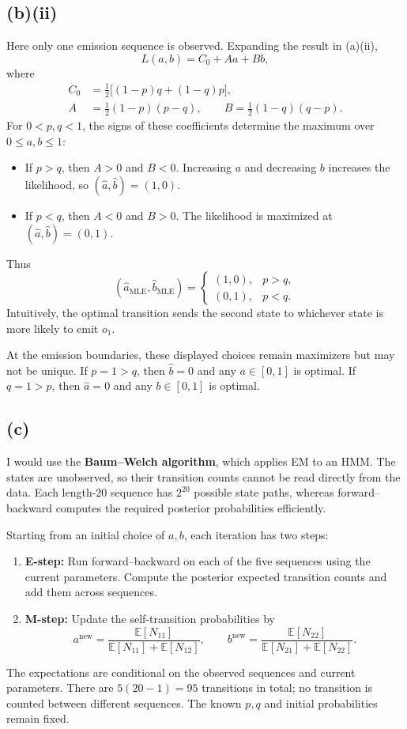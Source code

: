 \documentclass[11pt,a4paper]{article}
\newcommand{\E}{\mathbb{E}}
\begin{document}
\newpage
\subsection*{(b)(ii)}
Here only one emission sequence is observed. Expanding the result in (a)(ii),
\[
L(a,b)=C_0+A a+B b,
\]
where
\begin{align*}
C_0&=\tfrac12\big[(1-p)q+(1-q)p\big],\\
A&=\tfrac12(1-p)(p-q),\qquad
B=\tfrac12(1-q)(q-p).
\end{align*}
For $0<p,q<1$, the signs of these coefficients determine the maximum over $0\leq a,b\leq1$:
\begin{itemize}
\item If $p>q$, then $A>0$ and $B<0$. Increasing $a$ and decreasing $b$ increases the likelihood, so $(\hat a,\hat b)=(1,0)$.
\item If $p<q$, then $A<0$ and $B>0$. The likelihood is maximized at $(\hat a,\hat b)=(0,1)$.
\end{itemize}
Thus
\[
\boxed{(\hat a_{\mathrm{MLE}},\hat b_{\mathrm{MLE}})=
\begin{cases}
(1,0),&p>q,\\
(0,1),&p<q.
\end{cases}}
\]
Intuitively, the optimal transition sends the second state to whichever state is more likely to emit $o_1$.

At the emission boundaries, these displayed choices remain maximizers but may not be unique. If $p=1>q$, then $\hat b=0$ and any $a\in[0,1]$ is optimal. If $q=1>p$, then $\hat a=0$ and any $b\in[0,1]$ is optimal.

\subsection*{(c)}
I would use the \textbf{Baum--Welch algorithm}, which applies EM to an HMM. The states are unobserved, so their transition counts cannot be read directly from the data. Each length-20 sequence has $2^{20}$ possible state paths, whereas forward--backward computes the required posterior probabilities efficiently.

Starting from an initial choice of $a,b$, each iteration has two steps:
\begin{enumerate}
\item \textbf{E-step:} Run forward--backward on each of the five sequences using the current parameters. Compute the posterior expected transition counts and add them across sequences.
\item \textbf{M-step:} Update the self-transition probabilities by
\[
a^{\mathrm{new}}=\frac{\E[N_{11}]}{\E[N_{11}]+\E[N_{12}]},\qquad
b^{\mathrm{new}}=\frac{\E[N_{22}]}{\E[N_{21}]+\E[N_{22}]}.
\]
\end{enumerate}
The expectations are conditional on the observed sequences and current parameters. There are $5(20-1)=95$ transitions in total; no transition is counted between different sequences. The known $p,q$ and initial probabilities remain fixed.
\end{document}

